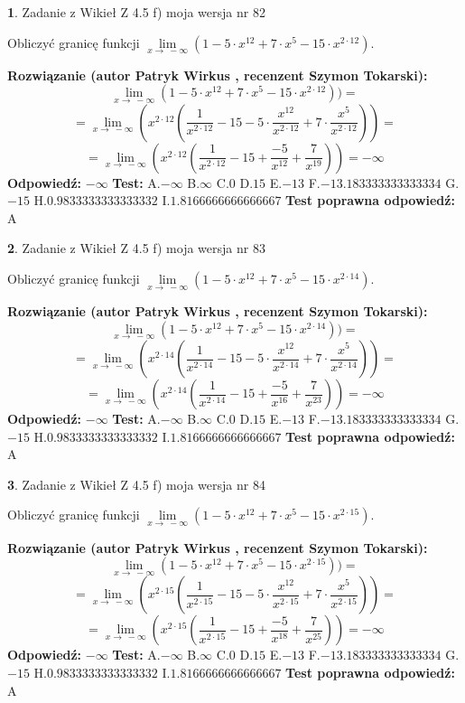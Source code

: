 \documentclass[12pt, a4paper]{article}
\theoremstyle{definition} %
\newtheorem{zad}{}
\newcommand{\zadStart}[1]{\begin{zad}#1\newline}
\newcommand{\zadStop}{\end{zad}}
\newcommand{\rozwStart}[2]{\noindent \textbf{Rozwiązanie (autor #1 , recenzent #2): }\newline}
\newcommand{\rozwStop}{\newline}
\newcommand{\odpStart}{\noindent \textbf{Odpowiedź:}\newline}
\newcommand{\odpStop}{\newline}
\newcommand{\testStart}{\noindent \textbf{Test:}\newline}
\newcommand{\testStop}{\newline}
\newcommand{\kluczStart}{\noindent \textbf{Test poprawna odpowiedź:}\newline}
\newcommand{\kluczStop}{\newline}
\begin{document}
\zadStart{Zadanie z Wikieł Z 4.5 f) moja wersja nr 82}


Obliczyć granicę funkcji  $\lim\limits_{x\to\ -\infty}(1 - 5 \cdot x^{12}+7 \cdot x^{5}- 15 \cdot x^{2\cdot12})$.
\zadStop
\rozwStart{Patryk Wirkus}{Szymon Tokarski}
$$\lim\limits_{x\to\ -\infty}(1 - 5 \cdot x^{12}+7 \cdot x^{5}- 15 \cdot x^{2\cdot12}))=$$
$$=\lim\limits_{x\to\ -\infty}(x^{2\cdot12}(\frac{1}{x^{2\cdot12}}-15 -5 \cdot \frac{x^{12}}{x^{2\cdot12}}+7 \cdot \frac{x^{5}}{x^{2\cdot12}}))=$$
$$=\lim\limits_{x\to\ -\infty}(x^{2\cdot12}(\frac{1}{x^{2\cdot12}}-15 + \frac{-5}{x^{12}}+ \frac{7}{x^{19}}))=-\infty$$
\rozwStop
\odpStart
$-\infty$
\odpStop
\testStart
A.$-\infty$ B.$\infty$ C.$0$ D.$15$ E.$-13$
F.$-13.183333333333334$ G.$-15$
H.$0.9833333333333332$
I.$1.8166666666666667$
\testStop
\kluczStart
A
\kluczStop



\zadStart{Zadanie z Wikieł Z 4.5 f) moja wersja nr 83}


Obliczyć granicę funkcji  $\lim\limits_{x\to\ -\infty}(1 - 5 \cdot x^{12}+7 \cdot x^{5}- 15 \cdot x^{2\cdot14})$.
\zadStop
\rozwStart{Patryk Wirkus}{Szymon Tokarski}
$$\lim\limits_{x\to\ -\infty}(1 - 5 \cdot x^{12}+7 \cdot x^{5}- 15 \cdot x^{2\cdot14}))=$$
$$=\lim\limits_{x\to\ -\infty}(x^{2\cdot14}(\frac{1}{x^{2\cdot14}}-15 -5 \cdot \frac{x^{12}}{x^{2\cdot14}}+7 \cdot \frac{x^{5}}{x^{2\cdot14}}))=$$
$$=\lim\limits_{x\to\ -\infty}(x^{2\cdot14}(\frac{1}{x^{2\cdot14}}-15 + \frac{-5}{x^{16}}+ \frac{7}{x^{23}}))=-\infty$$
\rozwStop
\odpStart
$-\infty$
\odpStop
\testStart
A.$-\infty$ B.$\infty$ C.$0$ D.$15$ E.$-13$
F.$-13.183333333333334$ G.$-15$
H.$0.9833333333333332$
I.$1.8166666666666667$
\testStop
\kluczStart
A
\kluczStop



\zadStart{Zadanie z Wikieł Z 4.5 f) moja wersja nr 84}


Obliczyć granicę funkcji  $\lim\limits_{x\to\ -\infty}(1 - 5 \cdot x^{12}+7 \cdot x^{5}- 15 \cdot x^{2\cdot15})$.
\zadStop
\rozwStart{Patryk Wirkus}{Szymon Tokarski}
$$\lim\limits_{x\to\ -\infty}(1 - 5 \cdot x^{12}+7 \cdot x^{5}- 15 \cdot x^{2\cdot15}))=$$
$$=\lim\limits_{x\to\ -\infty}(x^{2\cdot15}(\frac{1}{x^{2\cdot15}}-15 -5 \cdot \frac{x^{12}}{x^{2\cdot15}}+7 \cdot \frac{x^{5}}{x^{2\cdot15}}))=$$
$$=\lim\limits_{x\to\ -\infty}(x^{2\cdot15}(\frac{1}{x^{2\cdot15}}-15 + \frac{-5}{x^{18}}+ \frac{7}{x^{25}}))=-\infty$$
\rozwStop
\odpStart
$-\infty$
\odpStop
\testStart
A.$-\infty$ B.$\infty$ C.$0$ D.$15$ E.$-13$
F.$-13.183333333333334$ G.$-15$
H.$0.9833333333333332$
I.$1.8166666666666667$
\testStop
\kluczStart
A
\kluczStop
\end{document}
